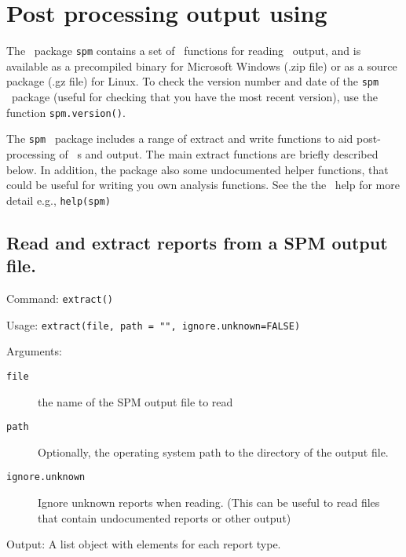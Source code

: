 \section{Post processing output using \R \label{sec:post-processing}}

The \R\ package \texttt{spm} contains a set of \R\ functions for reading \SPM\ output, and is available as a precompiled binary for Microsoft Windows (.zip file) or as a source package (.gz file) for Linux. To check the version number and date of the \texttt{spm} \R\ package (useful for checking that you have the most recent version), use the function \texttt{spm.version()}.

The \texttt{spm} \R\ package includes a range of extract and write functions to aid post-processing of \SPM\ \config s and output. The main extract functions are briefly described below. In addition, the package also some undocumented helper functions, that could be useful for writing you own analysis functions. See the the \R\ help for more detail e.g., \texttt{help(spm)}

\subsection{Read and extract reports from a SPM output file.}

Command: \texttt{extract()} 

Usage: \texttt{extract(file, path = "", ignore.unknown=FALSE)}

Arguments:
\begin{description}
\item[\texttt{file}] the name of the SPM output file to read
\item[\texttt{path}] Optionally, the operating system path to the directory of the output file.
\item[\texttt{ignore.unknown}] Ignore unknown reports when reading. (This can be useful to read files that contain undocumented reports or other output)
\end{description}

Output: A list object with elements for each report type.
